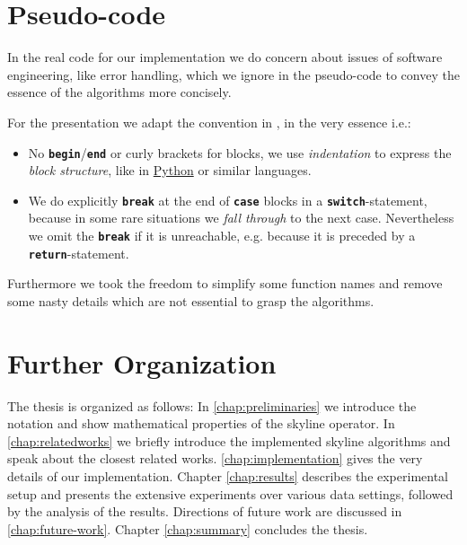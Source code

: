 \section{Pseudo-code}
In the real code for our implementation we do concern about issues of
software engineering, like error handling, which we ignore in the
pseudo-code to convey the essence of the algorithms more concisely.

For the presentation we adapt the convention in
\citep[Page~19]{Cormen2001}, in the very essence i.e.:

\begin{itemize}
\item 
No \texttt{\textbf{begin}}/\texttt{\textbf{end}} or curly brackets for
blocks, we use \emph{indentation} to express the \emph{block
structure}, like in \href{http://www.python.org/}{Python} or similar languages.

\item 
We do explicitly \texttt{\textbf{break}} at the end of
\texttt{\textbf{case}} blocks in a \texttt{\textbf{switch}}-statement,
because in some rare situations we \emph{fall through} to the next
case. Nevertheless we omit the \texttt{\textbf{break}} if it is
unreachable, e.g. because it is preceded by a
\texttt{\textbf{return}}-statement.
\end{itemize}

\noindent
Furthermore we took the freedom to simplify some function names and
remove some nasty details which are not essential to grasp the
algorithms.


\section{Further Organization}
The thesis is organized as follows: In \autoref{chap:preliminaries} we
introduce the notation and show mathematical properties of the skyline
operator.  In \autoref{chap:relatedworks} we briefly introduce the
implemented skyline algorithms and speak about the closest related
works. \autoref{chap:implementation} gives the very details of our
implementation. Chapter \ref{chap:results} describes the experimental setup
and presents the extensive experiments over various data settings,
followed by the analysis of the results. Directions of future work are
discussed in \autoref{chap:future-work}. Chapter \ref{chap:summary}
concludes the thesis.






